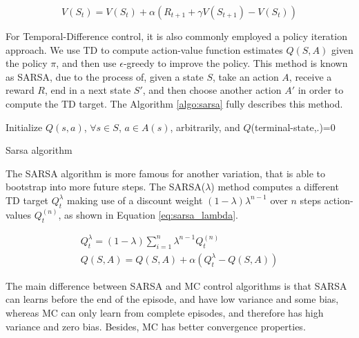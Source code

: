 \begin{equation}
V(S_t) = V(S_t) + \alpha(R_{t+1} + \gamma V(S_{t+1}) - V(S_t))
\label{eq:TD0_update}
\end{equation}

For Temporal-Difference control, it is also commonly employed a policy iteration approach. We use TD to compute action-value function estimates $Q(S,A)$ given the policy $\pi$, and then use $\epsilon$-greedy to improve the policy. This method is known as SARSA, due to the process of, given a state $S$, take an action $A$, receive a reward $R$, end in a next state $S'$, and then choose another action $A'$ in order to compute the TD target. The Algorithm \ref{algo:sarsa} fully describes this method.

\begin{algorithm}[H]
    \DontPrintSemicolon
    \SetAlgoLined
    Initialize $Q(s,a)$, $\forall s \in S$, $a \in A(s)$, arbitrarily, and $Q$(terminal-state,.)=0\;
    \caption{Sarsa algorithm}
    \label{algo:sarsa}
\end{algorithm}

The SARSA algorithm is more famous for another variation, that is able to bootstrap into more future steps. The SARSA($\lambda$) method computes a different TD target $Q_t^{\lambda}$ making use of a discount weight $(1-\lambda) \lambda^{n-1}$ over $n$ steps action-values $Q_t^{(n)}$, as shown in Equation \eqref{eq:sarsa_lambda}.

\begin{align}
Q_t^{\lambda} = (1 - \lambda) \sum_{i=1}^{n}{\lambda^{n-1}Q_t^{(n)}} \\
Q(S,A) = Q(S,A) + \alpha( Q_t^{\lambda} - Q(S,A))
\label{eq:sarsa_lambda}
\end{align}

The main difference between SARSA and MC control algorithms is that SARSA can learns before the end of the episode, and have low variance and some bias, whereas MC can only learn from complete episodes, and therefore has high variance and zero bias. Besides, MC has better convergence properties.

